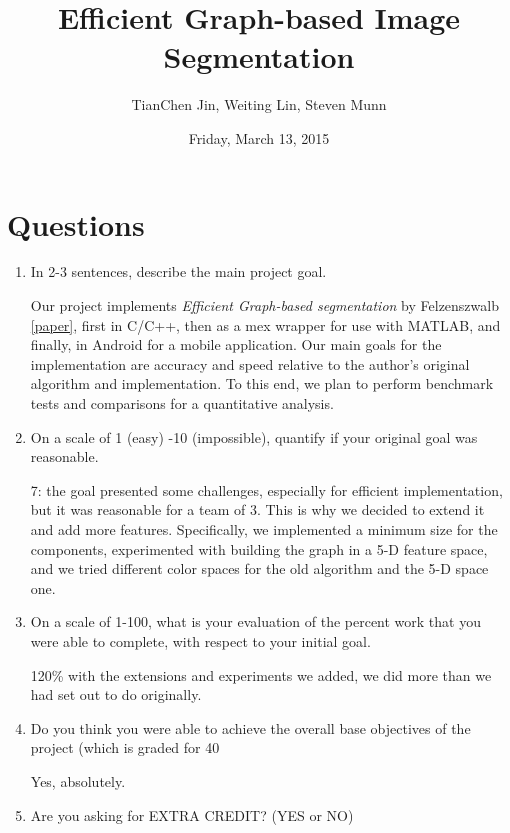 \documentclass[12pt, english, titlepage]{article}
\begin{document}
\title{Efficient Graph-based Image Segmentation}

\author{TianChen Jin, Weiting Lin, Steven Munn}

\date{Friday, March 13, 2015}

\maketitle

\section{Questions}

\begin{enumerate}
\item In 2-3 sentences, describe the main project goal.

Our project implements \emph{Efficient Graph-based segmentation} by Felzenszwalb \ref{paper}, first in C/C++, then as a mex wrapper for use with MATLAB, and finally, in Android for a mobile application. Our main goals for the implementation are accuracy and speed relative to the author's original algorithm and implementation. To this end, we plan to perform benchmark tests and comparisons for a quantitative analysis.

\item On a scale of 1 (easy) -10 (impossible), quantify if your original goal was reasonable.

7: the goal presented some challenges, especially for efficient implementation, but it was reasonable for a team of 3. This is why we decided to extend it and add more features. Specifically, we implemented a minimum size for the components, experimented with building the graph in a 5-D feature space, and we tried different color spaces for the old algorithm and the 5-D space one.

\item On a scale of 1-100, what is your evaluation of the percent work that you were able to complete, with respect to your initial goal.

120\% with the extensions and experiments we added, we did more than we had set out to do originally.

\item Do you think you were able to achieve the overall base objectives of the project (which is graded for 40%

Yes, absolutely.

\item Are you asking for EXTRA CREDIT?  (YES or NO)


\end{enumerate}
\end{document}
